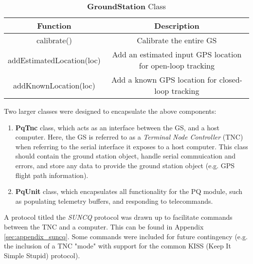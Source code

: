 \begin{table}[!htb]
  \centering
  \caption{\textbf{GroundStation} Class}
  \renewcommand{\arraystretch}{1.2}
  \begin{tabular}{ |c|c| }
  \hline
  \textbf{Function}             & \textbf{Description}    \\
  \hline
    calibrate()                 & Calibrate the entire GS \\
    addEstimatedLocation(loc)      & Add an estimated input GPS location for open-loop tracking \\
    addKnownLocation(loc)          & Add a known GPS location for closed-loop tracking \\
  \hline
  \end{tabular}
  \label{tab:groundStationUML}
\end{table}

\newpage
\noindent Two larger classes were designed to encapsulate the above components:
\begin{enumerate}
  \item \textbf{PqTnc} class, which acts as an interface between the GS, and a host computer. Here, the GS is referred to as a \textit{Terminal Node Controller} (TNC) when referring to the serial interface it exposes to a host computer. This class should contain the ground station object, handle serial commuication and errors, and store any data to provide the ground station object (e.g. GPS flight path information).
  \item \textbf{PqUnit} class, which encapsulates all functionality for the PQ module, such as populating telemetry buffers, and responding to telecommands.
\end{enumerate}

\noindent A protocol titled the \textit{SUNCQ} protocol was drawn up to facilitate commands between the TNC and a computer. This can be found in Appendix \ref{sec:appendix_suncq}. Some commands were included for future contingency (e.g. the inclusion of a TNC "mode" with support for the common KISS (Keep It Simple Stupid) protocol).
